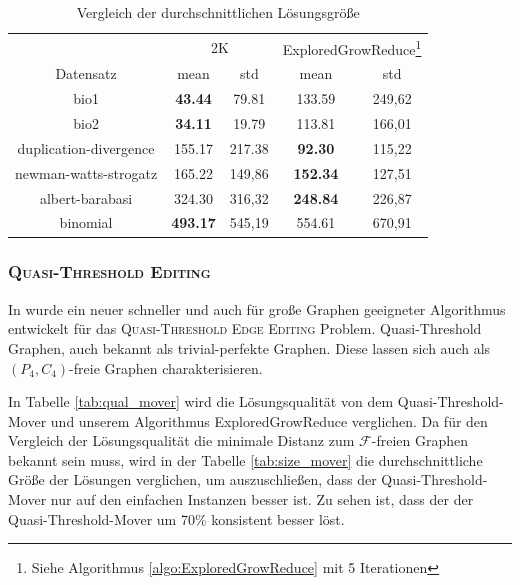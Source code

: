 \documentclass[12pt,a4paper,onecolumn,oneside,titlepage]{article}
\newcommand\cursive[1]{\ensuremath{\mathcal{#1}}}
\begin{document}
\begin{table}
\begin{tabular}{c|c c|c c} 
& \multicolumn{2}{c|}{2K} & \multicolumn{2}{c}{ExploredGrowReduce\footnote{Siehe Algorithmus \ref{algo:ExploredGrowReduce} mit 5 Iterationen }} \\ 
Datensatz & \multicolumn{1}{c}{mean}  &  \multicolumn{1}{c|}{std} &  \multicolumn{1}{c}{mean} &  \multicolumn{1}{c}{std} \\ 
\hline 
bio1  & \textbf{43.44}  & 79.81 & 133.59 & 249,62 \\ 
bio2 & \textbf{34.11} & 19.79 & 113.81 & 166,01 \\ 
duplication-divergence & 155.17 & 217.38 & \textbf{92.30} & 115,22 \\ 
newman-watts-strogatz  & 165.22 & 149,86 & \textbf{152.34} & 127,51 \\ 
albert-barabasi & 324.30 & 316,32 & \textbf{248.84} & 226,87 \\ 
binomial & \textbf{493.17} & 545,19 & 554.61 & 670,91 \\ 

\end{tabular} 
\caption{Vergleich der durchschnittlichen Lösungsgröße}
\label{tab:size_2k}
\end{table}


\subsubsection{\textsc{Quasi-Threshold Editing}}


In \cite{BrandesHSW15} wurde ein neuer schneller und auch für große Graphen geeigneter Algorithmus entwickelt für das \textsc{Quasi-Threshold Edge Editing} Problem. Quasi-Threshold Graphen, auch bekannt als trivial-perfekte Graphen. Diese lassen sich auch als $(P_4, C_4)$-freie Graphen charakterisieren. 

In Tabelle \ref{tab:qual_mover} wird die Lösungsqualität von dem Quasi-Threshold-Mover und unserem Algorithmus ExploredGrowReduce verglichen. Da für den Vergleich der Lösungsqualität die minimale Distanz zum \cursive{F}-freien Graphen bekannt sein muss, wird in der Tabelle \ref{tab:size_mover}  die durchschnittliche Größe der Lösungen verglichen, um auszuschließen, dass der Quasi-Threshold-Mover nur auf den einfachen Instanzen besser ist.
Zu sehen ist, dass der der Quasi-Threshold-Mover um 70\% konsistent besser löst.
\end{document}
